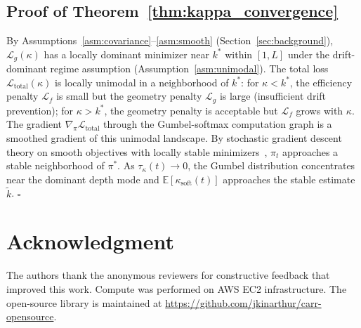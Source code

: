 \documentclass[lettersize,journal]{IEEEtran}
\newcommand{\E}{\mathbb{E}}
\newcommand{\calL}{\mathcal{L}}
\begin{document}
\subsection{Proof of Theorem~\ref{thm:kappa_convergence}}
\label{app:proof_kappa}

By Assumptions~\ref{asm:covariance}--\ref{asm:smooth}
(Section~\ref{sec:background}),
$\calL_g(\kappa)$ has a locally dominant minimizer near $k^*$ within
$[1, L]$ under the drift-dominant regime assumption
(Assumption~\ref{asm:unimodal}).
The total loss $\calL_{\text{total}}(\kappa)$ is locally unimodal in a
neighborhood of $k^*$:
for $\kappa < k^*$, the efficiency penalty $\calL_f$ is small but
the geometry penalty $\calL_g$ is large (insufficient drift prevention);
for $\kappa > k^*$, the geometry penalty is acceptable but $\calL_f$
grows with $\kappa$.
The gradient $\nabla_\pi \calL_{\text{total}}$ through the
Gumbel-softmax computation graph is a smoothed gradient of
this unimodal landscape.
By stochastic gradient descent theory on smooth objectives
with locally stable minimizers~\cite{bottou2018optimization},
$\pi_t$ approaches a stable neighborhood of $\pi^*$.
As $\tau_\kappa(t) \to 0$, the Gumbel distribution concentrates near
the dominant depth mode and $\E[\kappa_{\text{soft}}(t)]$ approaches
the stable estimate $\tilde{k}$.
$\square$


\section*{Acknowledgment}
The authors thank the anonymous reviewers for constructive feedback
that improved this work.
Compute was performed on AWS EC2 infrastructure.
The open-source library is maintained at
\url{https://github.com/jkinarthur/carr-opensource}.
\end{document}
